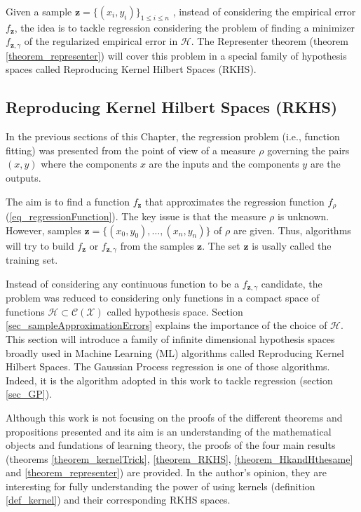 Given a sample $\pmb{z} = \{(x_i,y_i)\}_{1 \leq i \leq n}$ , instead of considering the empirical error $f_{\pmb{z}}$, the idea is to tackle regression considering the problem of finding a minimizer $f_{\pmb{z},\gamma}$ of the regularized empirical error in $\mathcal{H}$. The Representer theorem (theorem \ref{theorem_representer}) will cover this problem in a special family of hypothesis spaces called Reproducing Kernel Hilbert Spaces (RKHS).

\subsection{Reproducing Kernel Hilbert Spaces (RKHS)} \label{sec_RKHS}

In the previous sections of this Chapter, the regression problem (i.e., function fitting) was presented from the point of view of a measure $\rho$ governing the pairs $(x,y)$ where the components $x$ are the inputs and the components $y$ are the outputs. %

The aim is to find a function $f_{\pmb{z}}$ that approximates the regression function $f_{\rho}$ (\ref{eq_regressionFunction}). The key issue is that the measure $\rho$ is unknown. However, samples $\pmb{z} = \{(x_0,y_0), \dots, (x_n,y_n)\}$ of $\rho$ are given. Thus, algorithms will try to build $f_{\pmb{z}}$ or $f_{\pmb{z},\gamma}$ from the samples $\pmb{z}$. The set $\pmb{z}$ is usally called the training set. 

Instead of considering any continuous function to be a $f_{\pmb{z},\gamma}$ candidate, the problem was reduced to considering only functions in a compact space of functions $\mathcal{H} \subset \mathcal{C}(\mathcal{X})$ called hypothesis space. Section \ref{sec_sampleApproximationErrors} explains the importance of the choice of $\mathcal{H}$. This section will introduce a family of infinite dimensional hypothesis spaces broadly used in Machine Learning (ML) algorithms called Reproducing Kernel Hilbert Spaces. The Gaussian Process regression is one of those algorithms. Indeed, it is the algorithm adopted in this work to tackle regression (section \ref{sec_GP}). 

Although this work is not focusing on the proofs of the different theorems and propositions presented and its aim is an understanding of the mathematical objects and fundations of learning theory, the proofs of the four main results (theorems \ref{theorem_kernelTrick}, \ref{theorem_RKHS}, \ref{theorem_HkandHthesame} and \ref{theorem_representer}) are provided. In the author's opinion, they are interesting for fully understanding the power of using kernels (definition \ref{def_kernel}) and their corresponding RKHS spaces.


